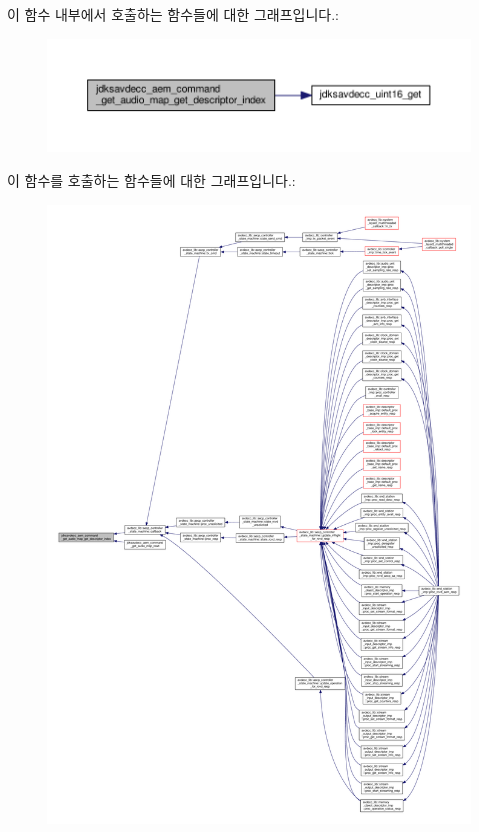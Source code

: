 이 함수 내부에서 호출하는 함수들에 대한 그래프입니다.\+:
\nopagebreak
\begin{figure}[H]
\begin{center}
\leavevmode
\includegraphics[width=350pt]{group__command__get__audio__map_ga06ae150bd8b86ff7a6a1631109268b74_cgraph}
\end{center}
\end{figure}




이 함수를 호출하는 함수들에 대한 그래프입니다.\+:
\nopagebreak
\begin{figure}[H]
\begin{center}
\leavevmode
\includegraphics[width=350pt]{group__command__get__audio__map_ga06ae150bd8b86ff7a6a1631109268b74_icgraph}
\end{center}
\end{figure}


